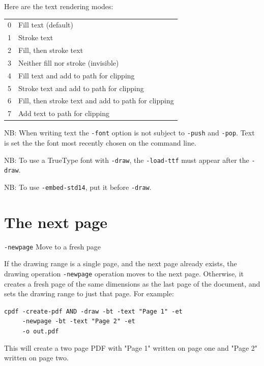 \documentclass{book}
\begin{document}
\noindent Here are the text rendering modes:

\bigskip
\begin{tabular}{ll}
0 & Fill text (default)\\
1 & Stroke text\\
2 & Fill, then stroke text\\
3 & Neither fill nor stroke (invisible)\\
4 & Fill text and add to path for clipping\\
5 & Stroke text and add to path for clipping\\
6 & Fill, then stroke text and add to path for clipping\\
7 & Add text to path for clipping
\end{tabular}
\bigskip

NB: When writing text the \texttt{-font} option is not subject to \texttt{-push} and \texttt{-pop}. Text is set the the font most recently chosen on the command line.

NB: To use a TrueType font with \texttt{-draw}, the \texttt{-load-ttf} must appear after the \texttt{-draw}.

NB: To use \texttt{-embed-std14}, put it before \texttt{-draw}.

\section{The next page}

  {\small\begin{framed}
   \vspace{1.5mm}
   \noindent\verb!-newpage! Move to a fresh page
  \end{framed}}

If the drawing range is a single page, and the next page already exists, the drawing operation \texttt{-newpage} operation moves to the next page. Otherwise, it creates a fresh page of the same dimensions as the last page of the document, and sets the drawing range to just that page. For example:

\begin{framed}
 \noindent\small\verb?cpdf -create-pdf AND -draw -bt -text "Page 1" -et?\\
 \noindent\small\verb?     -newpage -bt -text "Page 2" -et?\\
 \noindent\small\verb?     -o out.pdf?
\end{framed}

\noindent This will create a two page PDF with "Page 1" written on page one and "Page 2" written on page two.
\end{document}
